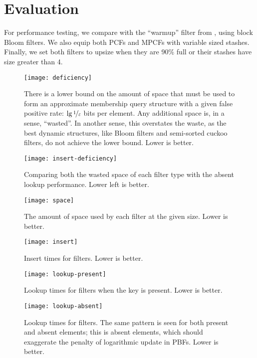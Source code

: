 \documentclass[letterpaper, 11pt]{article}
\begin{document}
\section{Evaluation}

For performance testing, we compare with the ``warmup'' filter from \cite{psw}, using block Bloom filters. \cite{block-bloom}
We also equip both PCFs and MPCFs with variable sized stashes. \cite{stash}
Finally, we set both filters to upsize when they are 90\% full or their stashes have size greater than 4.

\begin{figure}
  \texttt{[image: deficiency]}
  \caption{
    There is a lower bound on the amount of space that must be used to form an approximate membership query structure with a given false positive rate: $\lg \nicefrac{1}{\varepsilon}$ bits per element.
    Any additional space is, in a sense, ``wasted''.
    In another sense, this overstates the waste, as the best dynamic structures, like Bloom filters and semi-sorted cuckoo filters, do not achieve the lower bound.
    Lower is better.
  }
\end{figure}

\begin{figure}
  \texttt{[image: insert-deficiency]}
  \caption{
    Comparing both the wasted space of each filter type with the absent lookup performance.
    Lower left is better.
  }
\end{figure}

\begin{figure}
  \texttt{[image: space]}
  \caption{
    The amount of space used by each filter at the given size.
    Lower is better.
  }
\end{figure}


\begin{figure}
  \texttt{[image: insert]}
  \caption{
    Insert times for filters.
    Lower is better.
  }
\end{figure}

\begin{figure}
  \texttt{[image: lookup-present]}
  \caption{
    Lookup times for filters when the key is present.
    Lower is better.
  }
\end{figure}

\begin{figure}
  \texttt{[image: lookup-absent]}
  \caption{
    Lookup times for filters.
    The same pattern is seen for both present and absent elements; this is absent elements, which should exaggerate the penalty of logarithmic update in PBFs.
    Lower is better.
  }
\end{figure}
\end{document}
